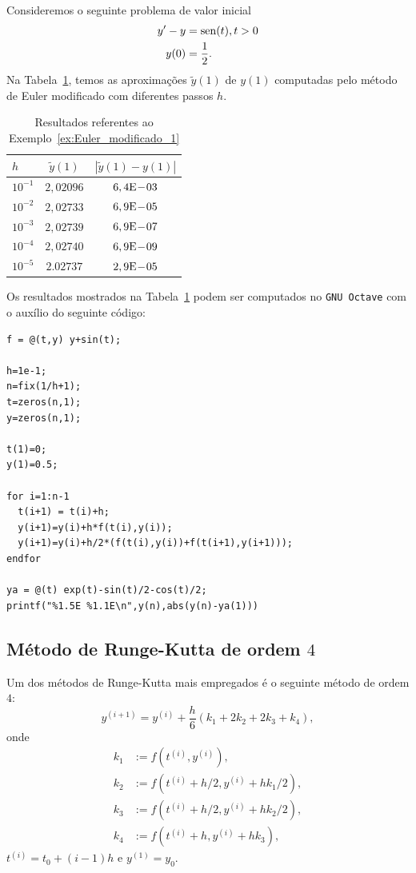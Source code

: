 \begin{ex}\label{ex:Euler_modificado_1}
  Consideremos o seguinte problema de valor inicial
  \begin{align}
    y' - y &= \operatorname{sen}(t), t>0\\
    y(0) &= \frac{1}{2}.
  \end{align}
  Na Tabela~\ref{tab:ex_Euler_modificado_1}, temos as aproximações $\tilde{y}(1)$ de $y(1)$ computadas pelo método de Euler modificado com diferentes passos $h$.
 
  \begin{table}[h!]
    \centering
    \begin{tabular}{l|cc}
      $h$ & $\tilde{y}(1)$ & $|\tilde{y}(1)-y(1)|$\\\hline
      $10^{-1}$ & $2,02096$ & $6,4\mathrm{E}\!-\!03$ \\
      $10^{-2}$ & $2,02733$ & $6,9\mathrm{E}\!-\!05$ \\
      $10^{-3}$ & $2,02739$ & $6,9\mathrm{E}\!-\!07$ \\
      $10^{-4}$ & $2,02740$ & $6,9\mathrm{E}\!-\!09$ \\
      $10^{-5}$ & $2.02737$ & $2,9\mathrm{E}\!-\!05$ \\\hline
    \end{tabular}
    \caption{Resultados referentes ao Exemplo~\ref{ex:Euler_modificado_1}}
    \label{tab:ex_Euler_modificado_1}
  \end{table}

\ifisoctave
Os resultados mostrados na Tabela~\ref{tab:ex_Euler_modificado_1} podem ser computados no \verb+GNU Octave+ com o auxílio do seguinte código:
\begin{verbatim}
f = @(t,y) y+sin(t);

h=1e-1;
n=fix(1/h+1);
t=zeros(n,1);
y=zeros(n,1);

t(1)=0;
y(1)=0.5;

for i=1:n-1
  t(i+1) = t(i)+h;
  y(i+1)=y(i)+h*f(t(i),y(i));
  y(i+1)=y(i)+h/2*(f(t(i),y(i))+f(t(i+1),y(i+1)));
endfor

ya = @(t) exp(t)-sin(t)/2-cos(t)/2;
printf("%1.5E %1.1E\n",y(n),abs(y(n)-ya(1)))
\end{verbatim}
\fi
\end{ex}

\subsection{Método de Runge-Kutta de ordem $4$}

Um dos métodos de Runge-Kutta mais empregados é o seguinte método de ordem $4$:
\begin{equation}
  y^{(i+1)} = y^{(i)} + \frac{h}{6}(k_1 + 2k_2 + 2k_3 + k_4),
\end{equation}
onde
\begin{align}
  k_1 &:= f(t^{(i)},y^{(i)}),\\
  k_2 &:= f(t^{(i)}+h/2,y^{(i)}+hk_1/2),\\
  k_3 &:= f(t^{(i)}+h/2,y^{(i)}+hk_2/2),\\
  k_4 &:= f(t^{(i)}+h,y^{(i)}+hk_3),
\end{align}
$t^{(i)}=t_0+(i-1)h$ e $y^{(1)}=y_0$.

